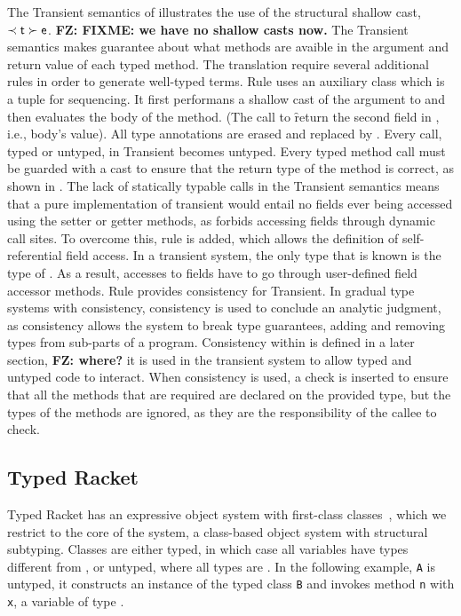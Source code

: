 \documentclass[acmlarge, anonymous, authordraft]{acmart}
\newcommand{\code}[1]{{\tt #1}\xspace}
\newcommand{\FZ}[1]{\textbf{FZ: #1}}
\begin{document}
The Transient semantics of  illustrates the use of the
structural shallow cast, $\ShaCast\t\e$. \FZ{FIXME: we have no shallow casts now.} The Transient semantics makes
guarantee about what methods are avaible in the argument and return value of
each typed method.  The translation require several additional rules in
order to generate well-typed terms. Rule  uses an auxiliary
class \A which is a tuple for sequencing. It first performans a shallow cast
of the argument \x to \C and then evaluates the body of the method. (The
call to \f return the second field in \A, i.e., body's value).  All type
annotations are erased and replaced by \any.  Every call, typed or untyped,
in Transient becomes untyped.  Every typed method call must be guarded with
a cast to ensure that the return type of the method is correct, as shown in
.  The lack of statically typable calls in the Transient
semantics means that a pure implementation of transient would entail no
fields ever being accessed using the setter or getter methods, as \kafka
forbids accessing fields through dynamic call sites. To overcome this, rule
 is added, which allows the definition of self-referential
field access. In a transient system, the only type that is known is the type
of \this.  As a result, accesses to fields have to go through user-defined
field accessor methods.  Rule  provides consistency for
Transient. In gradual type systems with consistency, consistency is used to
conclude an analytic judgment, as consistency allows the system to break
type guarantees, adding and removing types from sub-parts of a
program. Consistency within \kafka is defined in a later section, \FZ{where?}
it is used in the transient system to allow typed and untyped code to
interact. When consistency is used, a check is inserted to ensure that all
the methods that are required are declared on the provided type, but the
types of the methods are ignored, as they are the responsibility of the
callee to check.






\subsection{Typed Racket}

Typed Racket has an expressive object system with first-class
classes~\cite{Takikawa:2012}, which we restrict to the core of the system, a
class-based object system with structural subtyping. Classes are either typed,
in which case all variables have types different from \any, or untyped, where
all types are \any.  In the following example, \code A is untyped, it constructs
an instance of the typed class \code{B} and invokes method \code{n} with \code
x, a variable of type \any.
\end{document}
